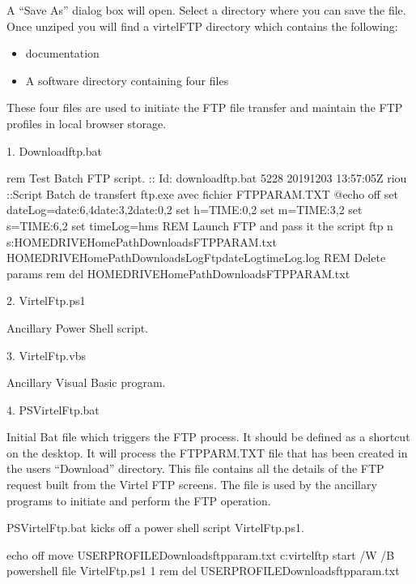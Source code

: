 \documentclass[letterpaper,10pt,english]{sphinxmanual}
\begin{document}
\sphinxAtStartPar
A “Save As” dialog box will open. Select a directory where you can save the file. Once unziped you will find a virtelFTP directory which contains the following:\sphinxhyphen{}
\begin{itemize}
\item {} 
\sphinxAtStartPar
documentation

\item {} 
\sphinxAtStartPar
A software directory containing four files

\end{itemize}

\sphinxAtStartPar
These four files are used to initiate the FTP file transfer and maintain the FTP profiles in local browser storage.

\begin{sphinxVerbatim}[commandchars=\\\{\}]
1.  Downloadftp.bat

    rem Test Batch FTP script.
    :: \PYGZdl{}Id: downloadftp.bat 5228 2019\PYGZhy{}12\PYGZhy{}03 13:57:05Z riou \PYGZdl{}
    ::Script Batch de transfert ftp.exe avec fichier FTPPARAM.TXT
    @echo off
    set dateLog=\PYGZpc{}date:\PYGZti{}6,4\PYGZpc{}\PYGZpc{}date:\PYGZti{}3,2\PYGZpc{}\PYGZpc{}date:\PYGZti{}0,2\PYGZpc{}
    set h=\PYGZpc{}TIME:\PYGZti{}0,2\PYGZpc{}
    set m=\PYGZpc{}TIME:\PYGZti{}3,2\PYGZpc{}
    set s=\PYGZpc{}TIME:\PYGZti{}6,2\PYGZpc{}
    set timeLog=\PYGZpc{}h\PYGZpc{}\PYGZus{}\PYGZpc{}m\PYGZpc{}\PYGZus{}\PYGZpc{}s\PYGZpc{}
    REM Launch FTP and pass it the  script
    ftp \PYGZhy{}n \PYGZhy{}s:\PYGZpc{}HOMEDRIVE\PYGZpc{}\PYGZpc{}HomePath\PYGZpc{}\PYGZbs{}Downloads\PYGZbs{}FTPPARAM.txt \PYGZgt{}\PYGZpc{}HOMEDRIVE\PYGZpc{}\PYGZpc{}HomePath\PYGZpc{}\PYGZbs{}Downloads\PYGZbs{}Log\PYGZus{}Ftp\PYGZus{}\PYGZpc{}dateLog\PYGZpc{}\PYGZus{}\PYGZpc{}timeLog\PYGZpc{}.log
    REM Delete params
    rem del \PYGZpc{}HOMEDRIVE\PYGZpc{}\PYGZpc{}HomePath\PYGZpc{}\PYGZbs{}Downloads\PYGZbs{}FTPPARAM.txt

2.  VirtelFtp.ps1

    Ancillary Power Shell script.

3.  VirtelFtp.vbs

    Ancillary Visual Basic program.

4.  PSVirtelFtp.bat

    Initial Bat file which triggers the FTP process. It should be defined as a short\PYGZhy{}cut on the desktop. It will process the FTPPARM.TXT file that has been created in the users “Download” directory. This file contains all the details of the FTP request built from the Virtel FTP screens. The file is used by the ancillary programs to initiate and perform the FTP operation.

    PSVirtelFtp.bat kicks off a power shell script VirtelFtp.ps1.

        echo off
        move \PYGZpc{}USERPROFILE\PYGZpc{}\PYGZbs{}Downloads\PYGZbs{}ftpparam.txt c:\PYGZbs{}virtel\PYGZbs{}ftp
        start /W /B powershell \PYGZhy{}file VirtelFtp.ps1 \PYGZpc{}1
        rem del \PYGZpc{}USERPROFILE\PYGZpc{}\PYGZbs{}Downloads\PYGZbs{}ftpparam.txt
\end{sphinxVerbatim}
\end{document}
